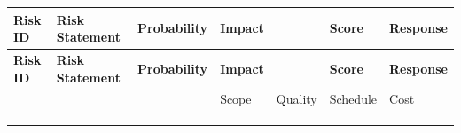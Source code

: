 \documentclass[10pt,letterpaper]{article}
\renewcommand\arraystretch{1.25}
\begin{document}
\begin{center}
\begingroup
\setlength\tabcolsep{2.0pt}
\scriptsize
\renewcommand\arraystretch{1.55}
\begin{longtable}{|>{\raggedright\arraybackslash}p{0.834in}|>{\raggedright\arraybackslash}p{0.834in}|>{\raggedright\arraybackslash}p{0.834in}|>{\raggedright\arraybackslash}p{0.834in}|>{\raggedright\arraybackslash}p{0.834in}|>{\raggedright\arraybackslash}p{0.834in}|>{\raggedright\arraybackslash}p{0.834in}|}
\hline
\rowcolor{light}
\textbf{Risk ID} & \textbf{Risk Statement} & \textbf{Probability} & \textbf{Impact} & \rule{0pt}{11pt}\hspace{0pt} & \textbf{Score} & \textbf{Response} \\ \hline
\endfirsthead
\hline\rowcolor{light} \textbf{Risk ID} & \textbf{Risk Statement} & \textbf{Probability} & \textbf{Impact} & \rule{0pt}{11pt}\hspace{0pt} & \textbf{Score} & \textbf{Response} \\ \hline
\endhead
\rule{0pt}{11pt}\hspace{0pt} & \rule{0pt}{11pt}\hspace{0pt} & \rule{0pt}{11pt}\hspace{0pt} & Scope & Quality & Schedule & Cost \\ \hline
\rule{0pt}{11pt}\hspace{0pt} & \rule{0pt}{11pt}\hspace{0pt} & \rule{0pt}{11pt}\hspace{0pt} & \rule{0pt}{11pt}\hspace{0pt} & \rule{0pt}{11pt}\hspace{0pt} & \rule{0pt}{11pt}\hspace{0pt} & \rule{0pt}{11pt}\hspace{0pt} \\ \hline
\rule{0pt}{11pt}\hspace{0pt} & \rule{0pt}{11pt}\hspace{0pt} & \rule{0pt}{11pt}\hspace{0pt} & \rule{0pt}{11pt}\hspace{0pt} & \rule{0pt}{11pt}\hspace{0pt} & \rule{0pt}{11pt}\hspace{0pt} & \rule{0pt}{11pt}\hspace{0pt} \\ \hline
\rule{0pt}{11pt}\hspace{0pt} & \rule{0pt}{11pt}\hspace{0pt} & \rule{0pt}{11pt}\hspace{0pt} & \rule{0pt}{11pt}\hspace{0pt} & \rule{0pt}{11pt}\hspace{0pt} & \rule{0pt}{11pt}\hspace{0pt} & \rule{0pt}{11pt}\hspace{0pt} \\ \hline

\end{longtable}
\end{center}
\end{document}
